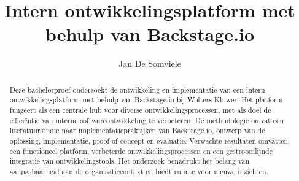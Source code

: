 \documentclass{hogent-article}
\title{Intern ontwikkelingsplatform met behulp van Backstage.io}
\author{Jan De Somviele}
\begin{document}
    
    \begin{abstract}
        Deze bachelorproef onderzoekt de ontwikkeling en implementatie van een intern ontwikkelingsplatform met behulp van Backstage.io bij Wolters Kluwer. Het platform fungeert als een centrale hub voor diverse ontwikkelingsprocessen, met als doel de efficiëntie van interne softwareontwikkeling te verbeteren. De methodologie omvat een literatuurstudie naar implementatiepraktijken van Backstage.io, ontwerp van de oplossing, implementatie, proof of concept en evaluatie. Verwachte resultaten omvatten een functioneel platform, verbeterde ontwikkelingsprocessen en een gestroomlijnde integratie van ontwikkelingstools. Het onderzoek benadrukt het belang van aanpasbaarheid aan de organisatiecontext en biedt ruimte voor nieuwe inzichten.
    \end{abstract}
    
    \tableofcontents
    
    
    
    \printbibliography[heading=bibintoc]
    
\end{document}

